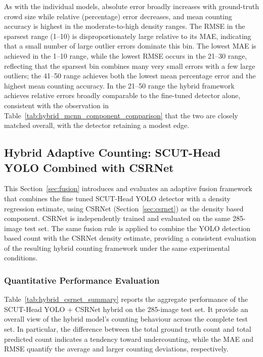 As with the individual models, absolute error broadly increases with ground-truth crowd size while relative (percentage) error decreases, and mean counting accuracy is highest in the moderate-to-high density ranges. The RMSE in the sparsest range (1--10) is disproportionately large relative to its MAE, indicating that a small number of large outlier errors dominate this bin. The lowest MAE is achieved in the 1--10 range, while the lowest RMSE occurs in the 21--30 range, reflecting that the sparsest bin combines many very small errors with a few large outliers; the 41--50 range achieves both the lowest mean percentage error and the highest mean counting accuracy. In the 21--50 range the hybrid framework achieves relative errors broadly comparable to the fine-tuned detector alone, consistent with the observation in Table~\ref{tab:hybrid_mcnn_component_comparison} that the two are closely matched overall, with the detector retaining a modest edge.

\subsection{Hybrid Adaptive Counting: SCUT-Head YOLO Combined with CSRNet}
\label{sec:hybrid_csrnet}

This Section~\ref{sec:fusion} introduces and evaluates an adaptive fusion framework that combines the fine tuned SCUT-Head YOLO detector with a density regression estimate, using CSRNet (Section~\ref{sec:csrnet}) as the density based component. CSRNet is independently trained and evaluated on the same 285-image test set. The same fusion rule is applied to combine the YOLO detection based count with the CSRNet density estimate, providing a consistent evaluation of the resulting hybrid counting framework under the same experimental conditions.

\subsubsection{Quantitative Performance Evaluation}

Table~\ref{tab:hybrid_csrnet_summary} reports the aggregate performance of the SCUT-Head YOLO + CSRNet hybrid on the 285-image test set. It provide an overall view of the hybrid model's counting behaviour across the complete test set. In particular, the difference between the total ground truth count and total predicted count indicates a tendency toward undercounting, while the MAE and RMSE quantify the average and larger counting deviations, respectively. 

